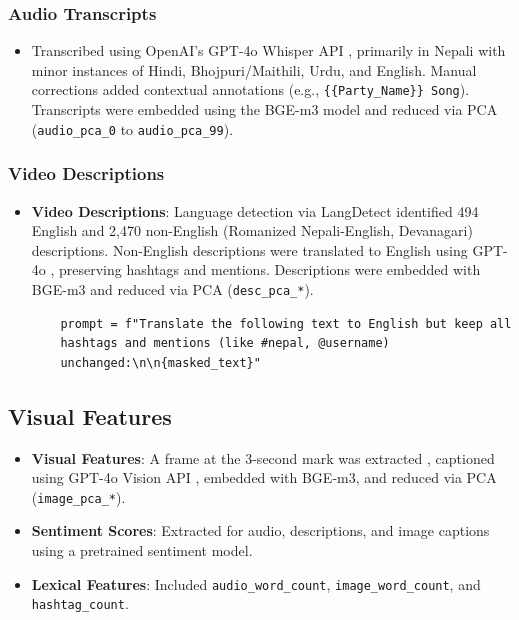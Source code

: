 \documentclass[12pt,a4paper]{report}
\begin{document}
\subsubsection{Audio Transcripts}

\begin{itemize}
    \item Transcribed using OpenAI’s GPT-4o Whisper API \parencite{OpenAI2024gpt4o}, primarily in Nepali with minor instances of Hindi, Bhojpuri/Maithili, Urdu, and English. Manual corrections added contextual annotations (e.g., \texttt{\{\{Party\_Name\}\} Song}). Transcripts were embedded using the BGE-m3 model \parencite{bge-m3} and reduced via PCA (\texttt{audio\_pca\_0} to \texttt{audio\_pca\_99}).
\end{itemize}

\subsubsection{Video Descriptions}

\begin{itemize}
    \item \textbf{Video Descriptions}: Language detection via LangDetect \parencite{langdetect} identified 494 English and 2,470 non-English (Romanized Nepali-English, Devanagari) descriptions. Non-English descriptions were translated to English using GPT-4o \parencite{OpenAI2024gpt4o}, preserving hashtags and mentions. Descriptions were embedded with BGE-m3 and reduced via PCA (\texttt{desc\_pca\_*}).

    \begin{verbatim}
    prompt = f"Translate the following text to English but keep all 
    hashtags and mentions (like #nepal, @username) 
    unchanged:\n\n{masked_text}"
    \end{verbatim}
\end{itemize}
\newpage
\subsection{Visual Features}
\begin{itemize}
 \item \textbf{Visual Features}: A frame at the 3-second mark was extracted \parencite{TikTokCreative2023}, captioned using GPT-4o Vision API \parencite{OpenAI2024gpt4o}, embedded with BGE-m3, and reduced via PCA (\texttt{image\_pca\_*}).
    \item \textbf{Sentiment Scores}: Extracted for audio, descriptions, and image captions using a pretrained sentiment model.
    \item \textbf{Lexical Features}: Included \texttt{audio\_word\_count}, \texttt{image\_word\_count}, and \texttt{hashtag\_count}.    

\end{itemize}
\end{document}
